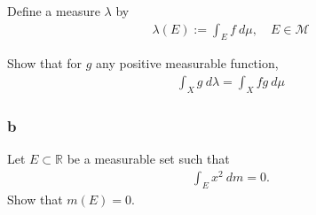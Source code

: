 Define a measure \(\lambda\) by
\begin{align*}
\lambda(E):=\int_{E} f ~d \mu, \quad E \in \mathcal{M}
\end{align*}

Show that for \(g\) any positive measurable function,
\begin{align*}
\int_{X} g ~d \lambda=\int_{X} f g ~d \mu
\end{align*}

\hypertarget{b-5}{%
\subsubsection{b}\label{b-5}}

Let \(E \subset {\mathbb{R}}\) be a measurable set such that
\begin{align*}
\int_{E} x^{2} ~d m=0.
\end{align*}
Show that \(m(E) = 0\).

